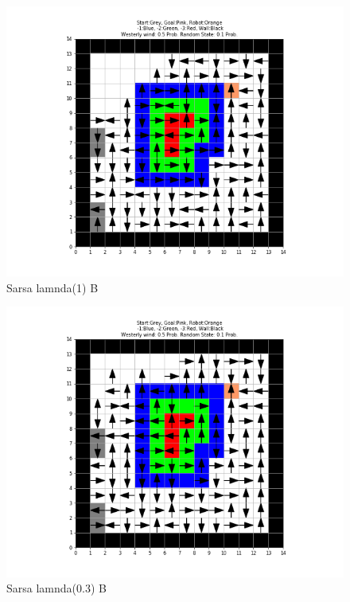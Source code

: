 \documentclass[12pt, letterpaper, twoside]{report}
\begin{document}
  \centering
  \begin{figure}[b]
    \includegraphics[width=\linewidth]{Sarsa__Problem_B_lambda_10.png}
    \caption{Sarsa lamnda(1) B }
  \end{figure}
  \centering
  \begin{figure}[b]
    \includegraphics[width=\linewidth]{Sarsa__Problem_B_lambda_03.png}
    \caption{Sarsa lamnda(0.3) B}
  \end{figure}
  \centering
\end{document}
